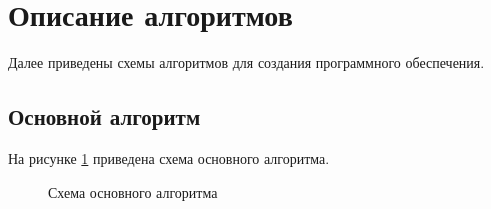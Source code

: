 \documentclass[a4paper,14pt]{report}
\begin{document}
\section{Описание алгоритмов}
Далее приведены схемы алгоритмов для создания программного обеспечения.
\subsection{Основной алгоритм}
На рисунке \ref{fig:sh1} приведена схема основного алгоритма.
\begin{figure}[H]
 \caption{Схема основного алгоритма}
 \label{fig:sh1}
\end{figure}
\end{document}
